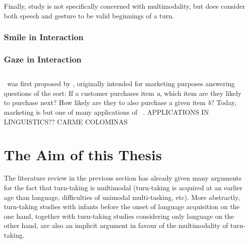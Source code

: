 Finally,  study is not specifically concerned with multimodality, but does consider both speech and gesture to be valid beginnings of a turn.

\subsubsection{Smile in Interaction}
\subsubsection{Gaze in Interaction}


\subsection{\fpmupper}
\fpmsentence\ was first proposed by \citet{agrawal_mining_1993}, originally intended for marketing purposes answering questions of the sort: If a customer purchases item \emph{a}, which item are they likely to purchase next? How likely are they to also purchase a given item \emph{b}? Today, marketing is but one of many applications of \fpmlower\ \citep[]{han_frequent_2007}.
APPLICATIONS IN LINGUISTICS?? CARME COLOMINAS

\section{The Aim of this Thesis}
\label{sec:introductionaim}
The literature review in the previous section has already given many arguments for the fact that turn-taking is multimodal (turn-taking is acquired at an earlier age than language, difficulties of unimodal multi-tasking, etc). %
More abstractly, turn-taking studies with infants before the onset of language acquisition on the one hand, together with turn-taking studies considering only language on the other hand, are also an implicit argument in favour of the multimodality of turn-taking. %






















